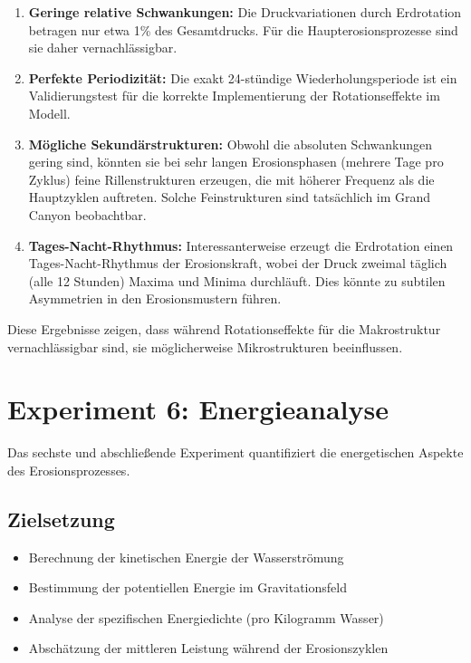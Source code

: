 ﻿\documentclass[12pt,a4paper]{report}
\begin{document}
\begin{enumerate}
	\item \textbf{Geringe relative Schwankungen:} Die Druckvariationen durch Erdrotation betragen nur etwa 1\% des Gesamtdrucks. Für die Haupterosionsprozesse sind sie daher vernachlässigbar.
	
	\item \textbf{Perfekte Periodizität:} Die exakt 24-stündige Wiederholungsperiode ist ein Validierungstest für die korrekte Implementierung der Rotationseffekte im Modell.
	
	\item \textbf{Mögliche Sekundärstrukturen:} Obwohl die absoluten Schwankungen gering sind, könnten sie bei sehr langen Erosionsphasen (mehrere Tage pro Zyklus) feine Rillenstrukturen erzeugen, die mit höherer Frequenz als die Hauptzyklen auftreten. Solche Feinstrukturen sind tatsächlich im Grand Canyon beobachtbar.
	
	\item \textbf{Tages-Nacht-Rhythmus:} Interessanterweise erzeugt die Erdrotation einen \glqq Tages-Nacht-Rhythmus\grqq{} der Erosionskraft, wobei der Druck zweimal täglich (alle 12 Stunden) Maxima und Minima durchläuft. Dies könnte zu subtilen Asymmetrien in den Erosionsmustern führen.
\end{enumerate}

Diese Ergebnisse zeigen, dass während Rotationseffekte für die Makrostruktur vernachlässigbar sind, sie möglicherweise Mikrostrukturen beeinflussen.

\section{Experiment 6: Energieanalyse}

Das sechste und abschließende Experiment quantifiziert die energetischen Aspekte des Erosionsprozesses.

\subsection{Zielsetzung}

\begin{itemize}
	\item Berechnung der kinetischen Energie der Wasserströmung
	\item Bestimmung der potentiellen Energie im Gravitationsfeld
	\item Analyse der spezifischen Energiedichte (pro Kilogramm Wasser)
	\item Abschätzung der mittleren Leistung während der Erosionszyklen
\end{itemize}
\end{document}
